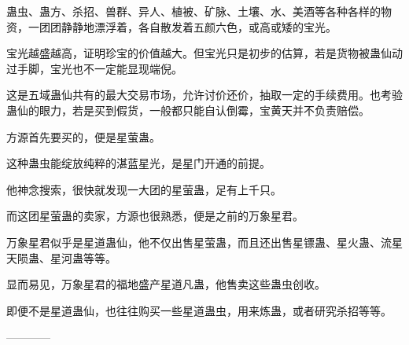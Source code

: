 \begin{this_body}
蛊虫、蛊方、杀招、兽群、异人、植被、矿脉、土壤、水、美酒等各种各样的物资，一团团静静地漂浮着，各自散发着五颜六色，或高或矮的宝光。

宝光越盛越高，证明珍宝的价值越大。但宝光只是初步的估算，若是货物被蛊仙动过手脚，宝光也不一定能显现端倪。

这是五域蛊仙共有的最大交易市场，允许讨价还价，抽取一定的手续费用。也考验蛊仙的眼力，若是买到假货，一般都只能自认倒霉，宝黄天并不负责赔偿。

方源首先要买的，便是星萤蛊。

这种蛊虫能绽放纯粹的湛蓝星光，是星门开通的前提。

他神念搜索，很快就发现一大团的星萤蛊，足有上千只。

而这团星萤蛊的卖家，方源也很熟悉，便是之前的万象星君。

万象星君似乎是星道蛊仙，他不仅出售星萤蛊，而且还出售星镖蛊、星火蛊、流星天陨蛊、星河蛊等等。

显而易见，万象星君的福地盛产星道凡蛊，他售卖这些蛊虫创收。

即便不是星道蛊仙，也往往购买一些星道蛊虫，用来炼蛊，或者研究杀招等等。

------------

\end{this_body}

